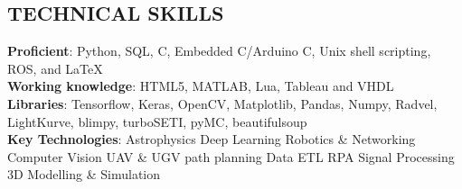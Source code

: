 \documentclass[11pt]{res} %
\newcommand{\titlegap}{5pt} %
\newcommand{\sectgap}{0.05in} %
\newcommand{\censectgap}{-.05in}
\begin{document}
\begin{resume}







\section{TECHNICAL SKILLS}

\vspace{0.1in} 

\textbf{Proficient}: Python, SQL, C, Embedded C/Arduino C, Unix shell scripting, ROS, and \LaTeX \vspace{0.05in}\\
\textbf{Working knowledge}: HTML5, MATLAB, Lua, Tableau and VHDL
\vspace{0.05in}\\
\textbf{Libraries}: Tensorflow, Keras, OpenCV, Matplotlib, Pandas, Numpy, Radvel, LightKurve, blimpy, turboSETI, pyMC, beautifulsoup
\vspace{0.05in}\\
\textbf{Key Technologies}: \textbullet{} Astrophysics \textbullet{} Deep Learning \textbullet{} Robotics \& Networking \textbullet{} Computer Vision \textbullet{} UAV \& UGV path planning \textbullet{} Data ETL \textbullet{} RPA \textbullet{} Signal Processing \textbullet{} 3D Modelling \& Simulation
\vspace{\sectgap}
\hline








\end{resume} 
\end{document}
